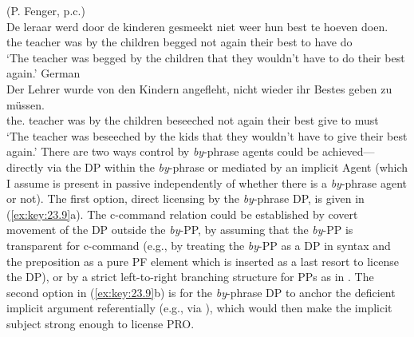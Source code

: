 \documentclass[output=paper]{langsci/langscibook}
\begin{document}
\ea\label{ex:key:23.8}
	\ea\label{ex:key:23.8a}  (P. Fenger, p.c.)\\
		\gll De leraar  werd  door de kinderen  gesmeekt niet  weer  hun best  te hoeven  doen.\\
			the teacher  was  by the children  begged not  again  their best  to have  do\\
		\glt ‘The teacher was begged by the children that they wouldn’t have to do their best again.’
	\ex\label{ex:key:23.8b} German\\
		\gll Der Lehrer  wurde  von den Kindern  angefleht, nicht  wieder  ihr Bestes  geben  zu müssen.\\
			the.\Nom{} teacher  was  by the children  beseeched not  again  their best  give  to must\\
		\glt ‘The teacher was beseeched by the kids that they wouldn’t have to give their best again.’
	\z
\z
%
There are two ways control by \emph{by}-phrase agents could be
achieved—directly via the DP within the \emph{by}-phrase or mediated by an
implicit Agent (which I assume is present in passive independently of whether
there is a \emph{by}-phrase agent or not). The first option, direct licensing
by the \emph{by}-phrase DP, is given in (\ref{ex:key:23.9}a). The c-command relation could be
established by covert movement of the DP outside the \emph{by}-PP, by
assuming that the \emph{by}-PP is transparent for c-command (e.g., by
treating the \emph{by}-PP as a DP in syntax and the preposition as a pure PF
element which is inserted as a last resort to license the DP), or by a strict
left-to-right branching structure for PPs as in \citet{Pesetsky1995}. The
second option in (\ref{ex:key:23.9}b) is for the \emph{by}-phrase DP to anchor the deficient
implicit argument referentially (e.g., via ), which would then make the
implicit subject strong enough to license PRO.\newpage
\end{document}
